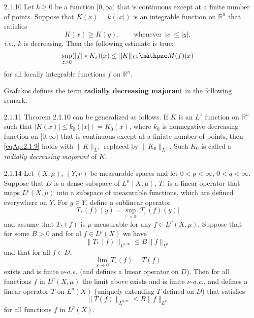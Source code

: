 \documentclass[../dissertation.tex]{subfiles}
\begin{document}
\begin{mthm}{2.1.10}
	Let $k\geq 0$ be a function $[0, \infty)$ that is continuous except at a 
	finite number of points. Suppose that $K(x) = k(|x|)$ is an integrable function 
	on $\mathbb R^n$ that satisfies 
	\[
		K(x) \geq K(y), \qquad \text{whenever }|x| \leq |y|,
	\]
	\textit{i.e.,} $k$ is decreasing. Then the following estimate is true:
	\begin{align}\label{eqAp:2.1.9}
		\sup_{\varepsilon > 0} (|f| * K_\varepsilon)(x) \leq \|K\|_{L^1} \mathpzc M(f)(x)
	\end{align}
	for all locally integrable functions $f$ on $\mathbb R^n$.
\end{mthm}

Grafakos defines the term \textbf{radially decreasing majorant} in the following
remark.

\begin{mrmk}{2.1.11}
	Theorem 2.1.10 can be generalized as follows. If $K$ is an $L^1$ function on
	$\mathbb R^n$ such that $|K(x)| \leq k_0(|x|) = K_0(x)$, where $k_0$ is nonnegative
	decreasing function on $[0,\infty)$ that is continuous except at a finiate number 
	of points, then \eqref{eqAp:2.1.9} holds with $\|K\|_{L^1}$ replaced by
	$\|K_0\|_{L^1}$. Such $K_0$ is called a \textit{radially decreasing majorant} of
	$K$. 
\end{mrmk}


\begin{mthm}{2.1.14}
	Let $(X, \mu)$, $(Y, \nu)$ be measurable spaces and let $0< p < \infty$, 
	$0<q<\infty$. Suppose that $D$ is a dense subspace of $L^p(X,\mu)$, 
	$T_\varepsilon$ is a linear operator that maps $L^p(X,\mu)$ into a subspace 
	of measurable functions, which are defined everywhere on $Y$. For $y\in Y$, 
	define a sublinear operator
	\[
		T_*(f)(y) = \sup_{\varepsilon>0} |T_\varepsilon (f)(y)|
	\]
	and assume that $T_*(f)$ is $\mu$-measurable for any $f\in L^p(X,\mu)$.
	Suppose that for some $B>0$ and for al $f \in L^p(X)$ we have
	\[
		\| T_*(f) \|_{L^{q,\infty }} \leq B \|f\|_{L^p}
	\]
	and that for all $f\in D$,
	\[
		\lim_{\varepsilon\to0} T_\varepsilon (f) = T(f)
	\]
	exists and is finite $\nu$-\textit{a.e.} (and defines a linear operator on $D$).
	Then for all functions $f$ in $L^p(X,\mu)$ the limit above exists and is
	finite $\nu$-\textit{a.e.}, and defines a linear operator $T$ on $L^p(X)$
	(uniquely extending $T$ defined on $D$) that satisfies
	\[
		\| T(f) \|_{L^{q,\infty}} \leq B \|f\|_{L^p}
	\]
	for all functions $f$ in $L^p(X)$.
\end{mthm}
\end{document}

